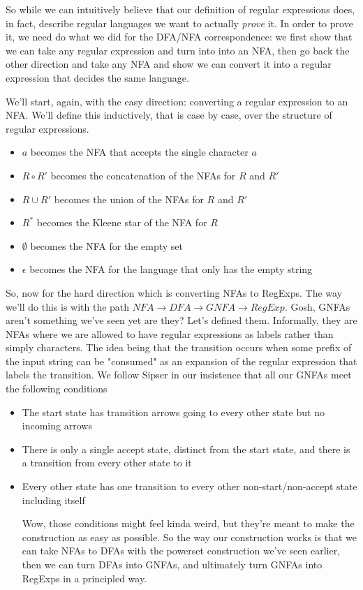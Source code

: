 \documentclass[11pt]{article}
\begin{document}
So while we can intuitively believe that our definition of regular expressions does, in fact, describe regular languages we want to actually \emph{prove} it. In order to prove it, we need do what we did for the DFA/NFA correspondence: we first show that we can take any regular expression and turn into into an NFA, then go back the other direction and take any NFA and show we can convert it into a regular expression that decides the same language.

We'll start, again, with the easy direction: converting a regular expression to an NFA. We'll define this inductively, that is case by case, over the structure of regular expressions.

\begin{itemize}
\item $a$ becomes the NFA that accepts the single character $a$
\item $R \circ R'$ becomes the concatenation of the NFAs for $R$ and $R'$
\item $R \cup R'$ becomes the union of the NFAs for $R$ and $R'$
\item $R^*$ becomes the Kleene star of the NFA for $R$
\item $\emptyset$ becomes the NFA for the empty set
\item $\epsilon$ becomes the NFA for the language that only has the empty string
\end{itemize}

So, now for the hard direction which is converting NFAs to RegExps. The way we'll do this is with the path $NFA \to DFA \to GNFA \to RegExp$. Gosh, GNFAs aren't something we've seen yet are they? Let's defined them. Informally, they are NFAs where we are allowed to have regular expressions as labels rather than simply characters. The idea being that the transition occurs when some prefix of the input string can be "consumed" as an expansion of the regular expression that labels the transition. We follow Sipser in our insistence that all our GNFAs meet the following conditions

\begin{itemize}
\item The start state has transition arrows going to every other state but no incoming arrows
\item There is only a single accept state, distinct from the start state, and there is a transition from every other state to it
\item Every other state has one transition to every other non-start/non-accept state including itself

Wow, those conditions might feel kinda weird, but they're meant to make the construction as easy as possible. So the way our construction works is that we can take NFAs to DFAs with the powerset construction we've seen earlier, then we can turn DFAs into GNFAs, and ultimately turn GNFAs into RegExps in a principled way.
\end{itemize}
\end{document}

